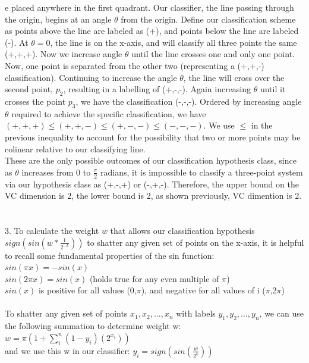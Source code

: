 \documentclass[11pt, oneside]{article}   	%
\begin{document}
e placed anywhere in the first quadrant.  Our classifier, the line passing through the origin, begins at an angle $\theta$ from the origin.  Define our classification scheme as points above the line are labeled as (+), and points below the line are labeled (-).  At $\theta =0$, the line is on the x-axis, and will classify all three points the same (+,+,+).  Now we increase angle $\theta$ until the line crosses one and only one point.  Now, one point is separated from the other two (representing a (+,+,-) classification).  Continuing to increase the angle $\theta$, the line will cross over the second point, $p_2$, resulting in a labelling of (+,-,-).  Again increasing $\theta$ until it crosses the point $p_3$, we have the classification (-,-,-).  Ordered by increasing angle $\theta$ required to achieve the specific classification, we have $(+,+,+) \leq (+,+,-) \leq (+,-,-) \leq (-,-,-)$.  We use $\leq$ in the previous inequality to account for the possibility that two or more points may be colinear relative to our classifying line.\\
\indent These are the only possible outcomes of our classification hypothesis class, since as $\theta$ increases from 0 to $\frac{\pi}{2}$ radians, it is impossible to classify a three-point system via our hypothesis class as (+,-,+) or (-,+,-).  Therefore, the upper bound on the VC dimension is 2, the lower bound is 2, as shown previously, VC dimention is 2.\\\\\\
3.  To calculate the weight $w$ that allows our classification hypothesis $sign(sin(w*\frac{1}{2^{-k}}))$ to shatter any given set of points on the x-axis, it is helpful to recall some fundamental properties of the sin function:\\ 
\indent $sin(\pi x) = -sin(x)$\\
\indent $sin(2\pi x) = sin(x)$ (holds true for any even multiple of $\pi$)\\
\indent $sin(x)$ is positive for all values (0,$\pi$), and negative for all values of i ($\pi$,2$\pi$)\\
\\ To shatter any given set of points $x_1,x_2,...,x_n$ with labels $y_1,y_2,...,y_n$, we can use the following summation to determine weight w:\\
\indent $w = \pi(1+\sum_i^n (1-y_i)(2^{x_i}))$\\
\indent and we use this w in our classifier: $y_i = sign(sin(\frac{w}{2^{k}}))$\\
\end{document}
